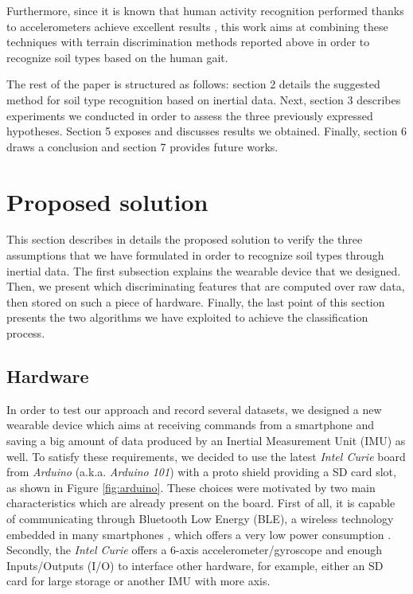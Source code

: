 \documentclass[conference]{IEEEtran}
\begin{document}
Furthermore, since it is known that human activity recognition performed thanks to accelerometers achieve excellent results \cite{Bayat2014, Bussmann2001, Cleland2013, Gao2014, Kwapisz2011, Ravi2005, Shoaib2013, Tuncel2009}, this work aims at combining these techniques with terrain discrimination methods reported above in order to recognize soil types based on the human gait.

The rest of the paper is structured as follows: section 2 details the suggested method for soil type recognition based on inertial data. Next, section 3 describes experiments we conducted in order to assess the three previously expressed hypotheses. Section 5 exposes and discusses results we obtained. Finally, section 6 draws a conclusion and section 7 provides future works.

\section{Proposed solution}

This section describes in details the proposed solution to verify the three assumptions that we have formulated in order to recognize soil types through inertial data. The first subsection explains the wearable device that we designed. Then, we present which discriminating features that are computed over raw data, then stored on such a piece of hardware. Finally, the last point of this section presents the two algorithms we have exploited to achieve the classification process.

\subsection{Hardware}

In order to test our approach and record several datasets, we designed a new wearable device which aims at receiving commands from a smartphone and saving a big amount of data produced by an Inertial Measurement Unit (IMU) as well. To satisfy these requirements, we decided to use the latest \textit{Intel Curie} board from \textit{Arduino} (a.k.a.\textit{ Arduino 101}) with a proto shield providing a SD card slot, as shown in Figure \ref{fig:arduino}. These choices were motivated by two main characteristics which are already present on the board. First of all, it is capable of communicating through Bluetooth Low Energy (BLE), a wireless technology embedded in many smartphones \cite{Taplett}, which offers a very low power consumption \cite{Gomez2012}. Secondly, the \textit{Intel Curie} offers a 6-axis accelerometer/gyroscope and enough Inputs/Outputs (I/O) to interface other hardware, for example, either an SD card for large storage or another IMU with more axis. 
\end{document}
